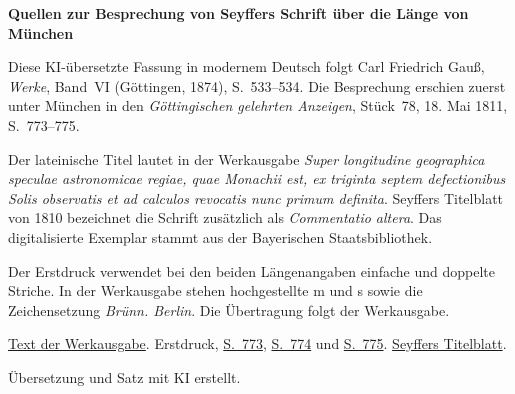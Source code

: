 \clearpage\thispagestyle{empty}
\begin{center}\textbf{Quellen zur Besprechung von Seyffers Schrift über die Länge von München}\end{center}
\noindent Diese KI-übersetzte Fassung in modernem Deutsch folgt Carl Friedrich Gauß, \textit{Werke}, Band~VI (Göttingen, 1874), S.~533--534. Die Besprechung erschien zuerst unter München in den \textit{Göttingischen gelehrten Anzeigen}, Stück~78, 18. Mai 1811, S.~773--775.
\par\smallskip\noindent Der lateinische Titel lautet in der Werkausgabe \textit{Super longitudine geographica speculae astronomicae regiae, quae Monachii est, ex triginta septem defectionibus Solis observatis et ad calculos revocatis nunc primum definita}. Seyffers Titelblatt von 1810 bezeichnet die Schrift zusätzlich als \textit{Commentatio altera}. Das digitalisierte Exemplar stammt aus der Bayerischen Staatsbibliothek.
\par\smallskip\noindent Der Erstdruck verwendet bei den beiden Längenangaben einfache und doppelte Striche. In der Werkausgabe stehen hochgestellte m und s sowie die Zeichensetzung \textit{Brünn. Berlin}. Die Übertragung folgt der Werkausgabe.
\par\smallskip\noindent \href{https://gdz.sub.uni-goettingen.de/id/PPN236007467}{Text der Werkausgabe}. Erstdruck, \href{https://images.p.sub.uni-goettingen.de/iiif/image/gdz:PPN319721507_1811:00000805/full/1650,/0/default.jpg}{S.~773}, \href{https://images.p.sub.uni-goettingen.de/iiif/image/gdz:PPN319721507_1811:00000806/full/1650,/0/default.jpg}{S.~774} und \href{https://images.p.sub.uni-goettingen.de/iiif/image/gdz:PPN319721507_1811:00000807/full/1650,/0/default.jpg}{S.~775}. \href{https://api.digitale-sammlungen.de/iiif/image/v2/bsb10723478_00009/full/1550,/0/default.jpg}{Seyffers Titelblatt}.
\par\smallskip\noindent Übersetzung und Satz mit KI erstellt.
\clearpage
